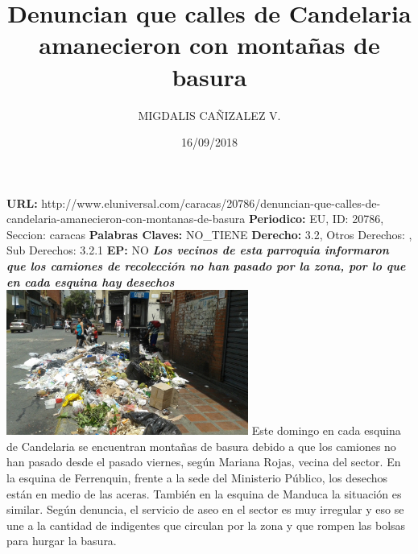 \documentclass{article}%
\title{\textbf{Denuncian que calles de Candelaria amanecieron con montañas de basura}}%
\author{MIGDALIS CAÑIZALEZ V.}%
\date{16/09/2018}%
\begin{document}
%
\normalsize%
\maketitle%
\textbf{URL: }%
http://www.eluniversal.com/caracas/20786/denuncian{-}que{-}calles{-}de{-}candelaria{-}amanecieron{-}con{-}montanas{-}de{-}basura\newline%
%
\textbf{Periodico: }%
EU, %
ID: %
20786, %
Seccion: %
caracas\newline%
%
\textbf{Palabras Claves: }%
NO\_TIENE\newline%
%
\textbf{Derecho: }%
3.2, %
Otros Derechos: %
, %
Sub Derechos: %
3.2.1\newline%
%
\textbf{EP: }%
NO\newline%
\newline%
%
\textbf{\textit{Los vecinos de esta parroquia informaron que los camiones de recolección no han  pasado  por la zona, por lo que en cada esquina hay desechos}}%
\newline%
\newline%
%
\includegraphics[width=300px]{23.jpg}%
\newline%
%
Este domingo en cada esquina de Candelaria se encuentran montañas de basura debido a que los camiones no han pasado desde el pasado viernes, según Mariana Rojas, vecina del sector.%
\newline%
%
En la esquina de Ferrenquin, frente a la sede del Ministerio Público, los desechos están en medio de las aceras. También en la esquina de Manduca la situación es similar.%
\newline%
%
Según denuncia, el servicio de aseo en el sector es muy irregular y eso se une a la cantidad de indigentes que circulan por la zona y que rompen las bolsas para hurgar la basura.%
\newline%
%
\end{document}
